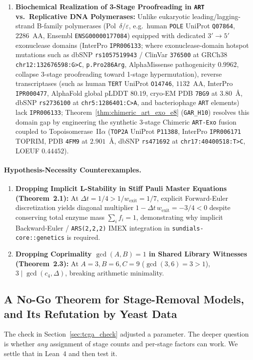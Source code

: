 \documentclass[11pt,a4paper]{article}
\theoremstyle{definition}
\begin{document}
\begin{enumerate}
  \item \textbf{Biochemical Realization of 3-Stage Proofreading in \texttt{ART} vs.\ Replicative DNA Polymerases:} Unlike eukaryotic leading/lagging-strand B-family polymerases (Pol~$\delta/\varepsilon$, e.g.\ human \texttt{POLE} UniProt \texttt{Q07864}, $2286$~AA, Ensembl \texttt{ENSG00000177084}) equipped with dedicated $3'\to 5'$ exonuclease domains (InterPro \texttt{IPR006133}; where exonuclease-domain hotspot mutations such as dbSNP \texttt{rs1057519943} / ClinVar \texttt{376500} at GRCh38 \texttt{chr12:132676598:G>C}, \texttt{p.Pro286Arg}, AlphaMissense pathogenicity $0.9962$, collapse 3-stage proofreading toward 1-stage hypermutation), reverse transcriptases (such as human \texttt{TERT} UniProt \texttt{O14746}, $1132$~AA, InterPro \texttt{IPR000477}, AlphaFold global pLDDT $80.19$, cryo-EM PDB \texttt{7BG9} at $3.80$~\AA, dbSNP \texttt{rs2736100} at \texttt{chr5:1286401:C>A}, and bacteriophage \texttt{ART} elements) lack \texttt{IPR006133}; Theorem~\ref{thm:chimeric_art_exo_e8} (\texttt{GAR\_H10}) resolves this domain gap by engineering the synthetic 3-stage Chimeric \texttt{ART-Exo} fusion coupled to Topoisomerase~II$\alpha$ (\texttt{TOP2A} UniProt \texttt{P11388}, InterPro \texttt{IPR006171} TOPRIM, PDB \texttt{4FM9} at $2.901$~\AA, dbSNP \texttt{rs471692} at \texttt{chr17:40400518:T>C}, LOEUF $0.44452$).
\end{enumerate}

\paragraph{Hypothesis-Necessity Counterexamples.}
\begin{enumerate}
  \item \textbf{Dropping Implicit L-Stability in Stiff Pauli Master Equations (Theorem~2.1):} At $\Delta t = 1/4 > 1/w_{\mathrm{exit}} = 1/7$, explicit Forward-Euler discretization yields diagonal multiplier $1 - \Delta t\,w_{\mathrm{exit}} = -3/4 < 0$ despite conserving total enzyme mass $\sum_i f_i = 1$, demonstrating why implicit Backward-Euler / \texttt{ARS(2,2,2)} IMEX integration in \texttt{sundials-core::genetics} is required.
  \item \textbf{Dropping Coprimality $\gcd(A,B)=1$ in Shared Library Witnesses (Theorem~2.3):} At $A = 3, B = 6, C = 9$ ($\gcd(3,6) = 3 > 1$), $3 \mid \gcd(c_4, \Delta)$, breaking arithmetic minimality.
\end{enumerate}

\subsection{A No-Go Theorem for Stage-Removal Models, and Its Refutation by Yeast Data}
\label{sec:psr}
The check in Section~\ref{sec:tcga_check} adjusted a parameter. The deeper question is whether
\emph{any} assignment of stage counts and per-stage factors can work. We settle that in Lean~4
and then test it.
\end{document}
